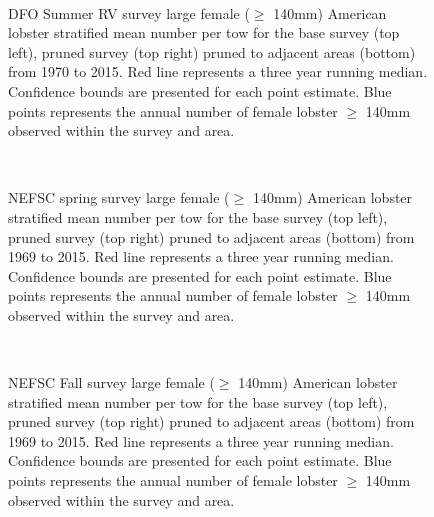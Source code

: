 \documentclass[11pt]{article}
\newcommand{\e}{/backup/bio_data/bio.lobster/figures/} %
\begin{document}
\begin{figure}
\centering
{}\\
\caption{DFO Summer RV survey large female ($\geq$ 140mm) American lobster stratified mean number per tow for the base survey (top left), pruned survey (top right) pruned to adjacent areas (bottom) from 1970 to 2015. Red line represents a three year running median. Confidence bounds are presented for each point estimate. Blue points represents the annual number of female lobster $\geq$ 140mm observed within the survey and area.}
\end{figure}
\clearpage

\begin{figure}
\centering
{}\\
\caption{NEFSC spring survey large female ($\geq$ 140mm) American lobster stratified mean number per tow for the base survey (top left), pruned survey (top right) pruned to adjacent areas (bottom) from 1969 to 2015. Red line represents a three year running median. Confidence bounds are presented for each point estimate. Blue points represents the annual number of female lobster $\geq$ 140mm observed within the survey and area.}
\end{figure}
\clearpage


\begin{figure}
\centering
{}\\
\caption{NEFSC Fall survey large female ($\geq$ 140mm) American lobster stratified mean number per tow for the base survey (top left), pruned survey (top right) pruned to adjacent areas (bottom) from 1969 to 2015. Red line represents a three year running median. Confidence bounds are presented for each point estimate. Blue points represents the annual number of female lobster $\geq$ 140mm observed within the survey and area.}
\end{figure}
\clearpage
\end{document}
